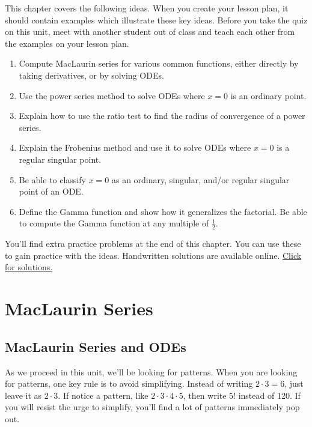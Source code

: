 

This chapter covers the following ideas. When you create your lesson plan, it should contain examples which illustrate these key ideas. Before you take the quiz on this unit, meet with another student out of class and teach each other from the examples on your lesson plan. 

\begin{enumerate}
\item Compute MacLaurin series for various common functions, either directly by taking derivatives, or by solving ODEs.
\item Use the power series method to solve ODEs where $x=0$ is an ordinary point.
\item Explain how to use the ratio test to find the radius of convergence of a power series. 
\item Explain the Frobenius method and use it to solve ODEs where $x=0$ is a regular singular point.
\item Be able to classify $x=0$ as an ordinary, singular, and/or regular singular point of an ODE. 
\item Define the Gamma function and show how it generalizes the factorial. Be able to compute the Gamma function at any multiple of $\frac{1}{2}$. 
\end{enumerate}

You'll find extra practice problems at the end of this chapter.  You can use these to gain practice with the ideas.  Handwritten solutions are available online.  \href{https://content.byui.edu/file/664390b8-e9cc-43a4-9f3c-70362f8b9735/1/08-Power-Series-Preparation-Solutions.pdf}{Click for solutions.}

\section{MacLaurin Series}

\subsection{MacLaurin Series and ODEs}
As we proceed in this unit, we'll be looking for patterns.  When you are looking for patterns, one key rule is to avoid simplifying.  Instead of writing $2\cdot 3=6$, just leave it as $2\cdot 3$.  If notice a pattern, like $2\cdot 3\cdot 4 \cdot 5$, then write $5!$ instead of 120. If you will resist the urge to simplify, you'll find a lot of patterns immediately pop out.  

